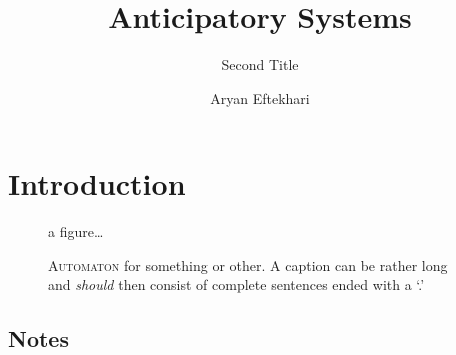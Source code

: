 \documentclass[]{usiinfdocprop}
\author{Aryan Eftekhari}
\title{Anticipatory Systems}
\subtitle{Second Title}
\begin{document}
\maketitle
\frontmatter
\tableofcontents
\mainmatter
\chapter[Short title]{Introduction}

\lipsum[2-5]

\begin{figure}
\centering
a figure\dots
\caption{\textsc{Automaton} for something or other. A caption can be rather
long and \emph{should} then consist of complete sentences ended with a `.'}
\end{figure}

\section{Notes}
\end{document}
